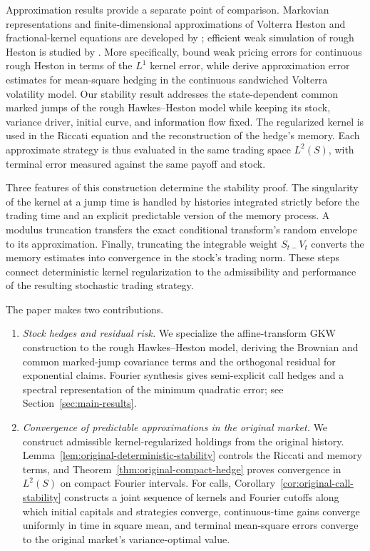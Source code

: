 \documentclass[11pt]{article}
\theoremstyle{definition}
\theoremstyle{remark}
\newcommand{\1}{\mathbf{1}}
\begin{document}
Approximation results provide a separate point of comparison. Markovian
representations and finite-dimensional approximations of Volterra Heston and
fractional-kernel equations are developed by
\citet{abijabereleuch2019markovian,abijabereleuch2019,
abijaber2019lifting,bayerbreneis2023}; efficient weak
simulation of rough Heston is studied by \citet{bayerbreneis2024simulation}.
More specifically, \citet{bayerbreneis2023weak} bound weak pricing errors for
continuous rough Heston in terms of the $L^1$ kernel error, while
\citet{dinunnoyurchenko2026} derive approximation error estimates for
mean-square hedging in the continuous sandwiched Volterra volatility model.
Our stability result addresses the state-dependent common marked jumps of the
rough Hawkes--Heston model while keeping its stock, variance driver, initial
curve, and information flow fixed. The regularized kernel is used in the
Riccati equation and the reconstruction of the hedge's memory. Each
approximate strategy is thus evaluated in the same trading space $L^2(S)$,
with terminal error measured against the same payoff and stock.

Three features of this construction determine the stability proof. The
singularity of the kernel at a jump time is handled by histories integrated
strictly before the trading time and an explicit predictable version of the
memory process. A modulus truncation transfers the exact conditional
transform's random envelope to its approximation. Finally, truncating the
integrable weight $S_{t-}V_t$ converts the memory estimates into convergence
in the stock's trading norm. These steps connect deterministic kernel
regularization to the admissibility and performance of the resulting
stochastic trading strategy.

The paper makes two contributions.
\begin{enumerate}[label=(\roman*)]
\item \textit{Stock hedges and residual risk.}
      We specialize the affine-transform GKW construction to the rough
      Hawkes--Heston model, deriving the Brownian and common marked-jump
      covariance terms and the orthogonal residual for exponential claims.
      Fourier synthesis gives semi-explicit call hedges and a spectral
      representation of the minimum quadratic error; see
      Section~\ref{sec:main-results}.

\item \textit{Convergence of predictable approximations in the original market.}
      We construct admissible kernel-regularized holdings from the original
      history. Lemma~\ref{lem:original-deterministic-stability} controls the
      Riccati and memory terms, and
      Theorem~\ref{thm:original-compact-hedge} proves convergence in $L^2(S)$
      on compact Fourier intervals. For calls,
      Corollary~\ref{cor:original-call-stability} constructs a joint sequence
      of kernels and Fourier cutoffs along which initial capitals and
      strategies converge, continuous-time gains converge uniformly in time
      in square mean, and terminal mean-square errors converge to the
      original market's variance-optimal value.
\end{enumerate}
\end{document}
